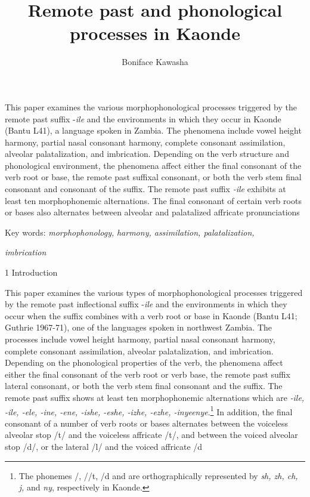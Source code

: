 \documentclass[output=paper]{langsci/langscibook}
\title{Remote past and phonological processes in Kaonde}
\author{%
Boniface Kawasha\affiliation{Savannah State University}
}
\begin{document}
\begin{stylelsAbstract}
This paper examines the various morphophonological processes triggered by the remote past suffix -\emph{ile} and the environments in which they occur in Kaonde (Bantu L41), a language spoken in Zambia. The phenomena include vowel height harmony, partial nasal consonant harmony, complete consonant assimilation, alveolar palatalization, and imbrication. Depending on the verb structure and phonological environment, the phenomena affect either the final consonant of the verb root or base, the remote past suffixal consonant, or both the verb stem final consonant and consonant of the suffix. The remote past suffix \emph{{}-ile} exhibits at least ten morphophonemic alternations. The final consonant of certain verb roots or bases also alternates between alveolar and palatalized affricate pronunciations 
\end{stylelsAbstract}

Key words: \textit{morphophonology,} \emph{harmony, assimilation, palatalization, }

\emph{                   imbrication}

\begin{stylelsSectioni}
1 Introduction
\end{stylelsSectioni}

This paper examines the various types of morphophonological processes triggered by the remote past inflectional suffix -\emph{ile} and the environments in which they occur when the suffix combines with a verb root or base in Kaonde (Bantu L41; Guthrie 1967-71), one of the languages spoken in northwest Zambia. The processes include vowel height harmony, partial nasal consonant harmony, complete consonant assimilation, alveolar palatalization, and imbrication. Depending on the phonological properties of the verb, the phenomena affect either the final consonant of the verb root or verb base, the remote past suffix lateral consonant, or both the verb stem final consonant and the suffix. The remote past suffix shows at least ten morphophonemic alternations which are \emph{{}-ile, -ile, -ele, -ine, -ene, -ishe, -eshe, -izhe, -ezhe, -inye}\emph{enye}.\footnote{The phonemes /, //t, /d and \textstyleipa{/}\href{http://en.wikipedia.org/wiki/Ɲ}{}\textstyleipa{/} are orthographically represented by \textit{sh, zh, ch, j,} and \textit{ny}, respectively in Kaonde.} 
In addition, the final consonant of a number of verb roots or bases alternates between the voiceless alveolar stop /t/ and the voiceless affricate /t/, and between the voiced alveolar stop /d/, or the lateral /l/ and the voiced affricate /d
\end{document}
